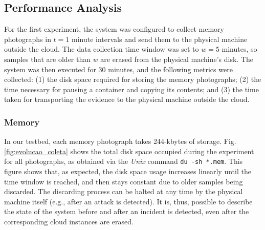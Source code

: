 \documentclass[conference]{IEEEtran}
\newcommand{\marcos}[1]{{\color{green}{MARCOS: #1}}}
\newcommand{\fancyname}{Dizang}
\begin{document}
\subsection{Performance Analysis}
\label{sec:proposal-exp}

%
For the first experiment, the system was configured to collect memory photographs in $t=1$ minute intervals and send them to the physical machine outside the cloud.
%
The data collection time window was set to $w=5$ minutes, so samples that are older than $w$ are erased from the physical machine's disk.
%
The system was then executed for 30 minutes, and the following metrics were collected: 
(1) the disk space required for storing the memory photographs; 
(2) the time necessary for pausing a container and copying its contents; and 
(3) the time taken for transporting the evidence to the physical machine outside the cloud.
%
%

\subsubsection{Memory}

In our testbed, each memory photograph takes 244-kbytes of storage.
%
Fig. \ref{fig:evolucao_coleta} shows the total disk space occupied during the experiment for all photographs, as obtained via the \textit{Unix} command \texttt{du -sh *.mem}. 
%
This figure shows that, as expected, the disk space usage increases linearly until the time window is reached, and then stays constant due to older samples being discarded.
%
The discarding process can be halted at any time by the physical machine itself (e.g., after an attack is detected).
%
It is, thus, possible to describe the state of the system before and after an incident is detected, even after the corresponding cloud instances are erased.


%
%
\end{document}
